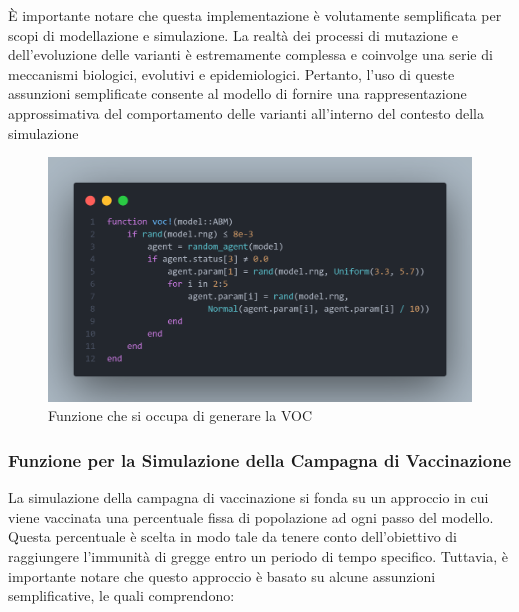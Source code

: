 È importante notare che questa implementazione è volutamente 
semplificata per scopi di modellazione e simulazione. 
La realtà dei processi di mutazione e dell'evoluzione delle varianti è 
estremamente complessa e coinvolge una serie di meccanismi biologici, 
evolutivi e epidemiologici. Pertanto, l'uso di queste assunzioni 
semplificate consente al modello di fornire una rappresentazione 
approssimativa del comportamento delle varianti all'interno del 
contesto della simulazione \cite{Abavisani2022} \cite{Markov2023} 
\cite{https://doi.org/10.1002/jmv.27331} 

\begin{figure}[H]
    \begin{center}
		\includegraphics[width=\textwidth]{img/voc.png}
		\caption{Funzione che si occupa di generare la VOC}
		\label{fig:voc}
	\end{center}
\end{figure}

\subsubsection{Funzione per la Simulazione della Campagna di Vaccinazione}

La simulazione della campagna di vaccinazione si fonda su un approccio 
in cui viene vaccinata una percentuale fissa di popolazione ad ogni 
passo del modello. Questa percentuale è scelta in modo tale da tenere 
conto dell'obiettivo di raggiungere l'immunità di gregge entro un 
periodo di tempo specifico. Tuttavia, è importante notare che questo 
approccio è basato su alcune assunzioni semplificative, le quali 
comprendono:

